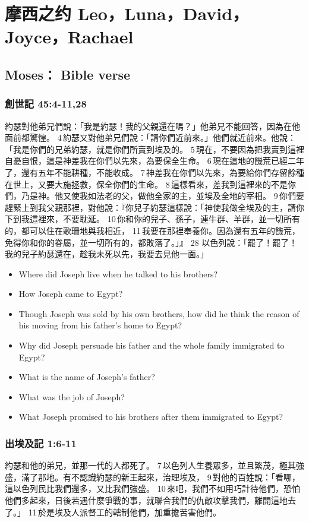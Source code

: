 \chapter{摩西之约 Leo，Luna，David，Joyce，Rachael}

\section{Moses： Bible verse}
\subsection{創世記 45:4-11,28}
約瑟對他弟兄們說：「我是約瑟！我的父親還在嗎？」他弟兄不能回答，因為在他面前都驚惶。 4 約瑟又對他弟兄們說：「請你們近前來。」他們就近前來。他說：「我是你們的兄弟約瑟，就是你們所賣到埃及的。 5 現在，不要因為把我賣到這裡自憂自恨，這是神差我在你們以先來，為要保全生命。 6 現在這地的饑荒已經二年了，還有五年不能耕種，不能收成。 7 神差我在你們以先來，為要給你們存留餘種在世上，又要大施拯救，保全你們的生命。 8 這樣看來，差我到這裡來的不是你們，乃是神。他又使我如法老的父，做他全家的主，並埃及全地的宰相。 9 你們要趕緊上到我父親那裡，對他說：『你兒子約瑟這樣說：「神使我做全埃及的主，請你下到我這裡來，不要耽延。 10 你和你的兒子、孫子，連牛群、羊群，並一切所有的，都可以住在歌珊地與我相近， 11 我要在那裡奉養你。因為還有五年的饑荒，免得你和你的眷屬，並一切所有的，都敗落了。」』
28 以色列說：「罷了！罷了！我的兒子約瑟還在，趁我未死以先，我要去見他一面。」

\begin{itemize}
\item Where did Joseph live when he talked to his brothers?
\item How Joseph came to Egypt?
\item Though Joseph was sold by his own brothers, how did he think the reason of his moving from his father's home to Egypt?
\item Why did Joseph persuade his father and the whole family immigrated to Egypt?
\item What is the name of Joseph's father?
\item What was the job of Joseph?
\item What Joseph promised to his brothers after them immigrated to Egypt?
\end{itemize}


\subsection{出埃及記 1:6-11}
約瑟和他的弟兄，並那一代的人都死了。 7 以色列人生養眾多，並且繁茂，極其強盛，滿了那地。有不認識約瑟的新王起來，治理埃及， 9 對他的百姓說：「看哪，這以色列民比我們還多，又比我們強盛。 10 來吧，我們不如用巧計待他們，恐怕他們多起來，日後若遇什麼爭戰的事，就聯合我們的仇敵攻擊我們，離開這地去了。」 11 於是埃及人派督工的轄制他們，加重擔苦害他們。

